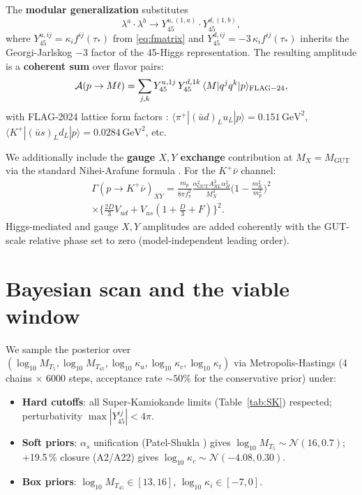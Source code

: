 \documentclass[reprint,prl,nofootinbib,floatfix,linenumbers]{revtex4-2}
\newcommand{\GeV}{\,\mathrm{GeV}}
\newcommand{\Gut}{\mathrm{GUT}}
\newcommand{\MGUT}{M_\Gut}
\newcommand{\MTfive}{M_{T_5}}
\newcommand{\MTfortyfive}{M_{T_{45}}}
\newcommand{\taustar}{\tau_*}
\begin{document}
The {\bf modular generalization} substitutes
\begin{equation}
\label{eq:replacement}
\lambda^a\cdot\lambda^b \longrightarrow Y_{45}^{u,(1,a)}\cdot Y_{45}^{d,(1,b)},
\end{equation}
where $Y_{45}^{u,ij}=\kappa_i f^{ij}(\taustar)$ from \eqref{eq:fmatrix} and
$Y_{45}^{d,ij}=-3\,\kappa_i f^{ij}(\taustar)$ inherits the Georgi-Jarlskog
$-3$ factor of the 45-Higgs representation. The resulting amplitude is a
{\bf coherent sum} over flavor pairs:
\begin{equation}
\mathcal{A}(p\to M\ell) = \sum_{j,k}
Y_{45}^{u,1j}\,Y_{45}^{d,1k}\,\langle M|q^j q^k|p\rangle_{\rm FLAG-24},
\end{equation}
with FLAG-2024 lattice form factors \cite{Yoo2021,FLAG2024}:
$\langle\pi^+|(\bar u d)_L u_L|p\rangle = 0.151\GeV^2$,
$\langle K^+|(\bar u s)_L d_L|p\rangle = 0.0284\GeV^2$, etc.

We additionally include the {\bf gauge $X,Y$ exchange} contribution at
$M_X=\MGUT$ via the standard Nihei-Arafune formula \cite{NiheiArafune1995}.
For the $K^+\bar\nu$ channel:
\begin{multline}
\Gamma(p\to K^+\bar\nu)_{XY} =
\frac{m_p}{8\pi f_\pi^2}\frac{\alpha_\Gut^2 A_{RL}^2 \alpha_H^2}{M_X^4}
\bigl(1-\tfrac{m_K^2}{m_p^2}\bigr)^2\\
\times\bigl\{\tfrac{2D}{3}V_{ud} + V_{us}(1+\tfrac{D}{3}+F)\bigr\}^2.
\end{multline}
Higgs-mediated and gauge $X,Y$ amplitudes are added coherently with
the GUT-scale relative phase set to zero (model-independent leading
order).

\section{Bayesian scan and the viable window}
\label{sec:bayes}

We sample the posterior over
$(\log_{10}\MTfive,\log_{10}\MTfortyfive,\log_{10}\kappa_u,\log_{10}\kappa_c,
\log_{10}\kappa_t)$ via Metropolis-Hastings (4 chains $\times$ 6000 steps,
acceptance rate $\sim 50\%$ for the conservative prior) under:
\begin{itemize}
\item {\bf Hard cutoffs}: all Super-Kamiokande limits (Table~\ref{tab:SK})
respected; perturbativity $\max|Y_{45}^{ij}|<4\pi$.
\item {\bf Soft priors}: $\alpha_s$ unification (Patel-Shukla
\cite{PatelShukla2023}) gives $\log_{10}\MTfive\sim\mathcal N(16,0.7)$;
+19.5\,\% closure (A2/A22) gives
$\log_{10}\kappa_c\sim\mathcal N(-4.08, 0.30)$.
\item {\bf Box priors}: $\log_{10}\MTfortyfive\in[13,16]$,
$\log_{10}\kappa_i\in[-7,0]$.
\end{itemize}
\end{document}
